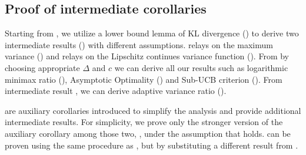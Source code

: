 \subsection{Proof of intermediate corollaries}


Starting from , we utilize a lower bound lemma of KL divergence () to derive two intermediate results () with different assumptions.  relays on the maximum variance () and  relays on the Lipschitz continues variance function (). From  by choosing appropriate $\Delta$ and $c$ we can derive all our results such as logarithmic minimax ratio (), Asymptotic Optimality () and Sub-UCB criterion (). From intermediate result , we can derive adaptive variance ratio ().


 are auxiliary corollaries introduced to simplify the analysis and provide additional intermediate results. 
For simplicity, we prove only the stronger version of the auxiliary corollary among those two, , under the assumption that  holds. 
 can be proven using the same procedure as , but by substituting a different result from .


